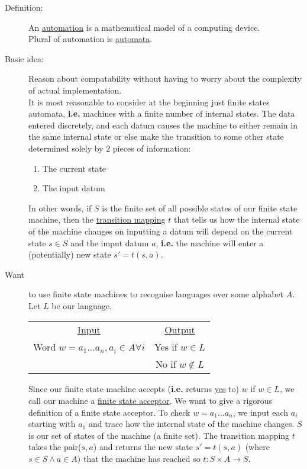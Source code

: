 \documentclass[10pt]{article}
\begin{document}
	\begin{description}
		\item[Definition:] An \underline{automation} is a mathematical model of a computing device. \\
		Plural of automation is \underline{automata}.
		\item[Basic idea:] Reason about compatability without having to worry about the complexity of actual implementation. \\
		It is most reasonable to consider at the beginning just finite states automata, \textbf{i.e.} machines with a finite number of internal states. The data entered discretely, and each datum causes the machine to either remain in the same internal state or else make the transition to some other state determined solely by 2 pieces of information:
		\begin{enumerate}
			\item The current state
			\item The input datum
		\end{enumerate}
		In other words, if $S$ is the finite set of all possible states of our finite state machine, then the \underline{transition mapping} $t$ that tells us how the internal state of the machine changes on inputting a datum will depend on the current state $s \in S$ and the imput datum $a$, \textbf{i.e.} the machine will enter a (potentially) new state $s' = t(s, a)$.
		\item[Want] to use finite state machines to recognise languages over some alphabet $A$. Let $L$ be our language.\\
		\begin{table}[h!]
			\centering
			\begin{tabular}{cc}
				\underline{Input} & \underline{Output} \\
				Word $w=a_1...a_n, a_i \in A \forall i$ & Yes if $w \in L$ \\
				& No if $w \notin L$
			\end{tabular}
		\end{table}
		Since our finite state machine accepts (\textbf{i.e.} returns \underline{yes} to) $w$ if $w \in L$, we call our machine a \underline{finite state acceptor}. We want to give a rigorous definition of a finite state acceptor. To check $w=a_1...a_n$, we input each $a_i$ starting with $a_1$ and trace how the internal state of the machine changes. $S$ is our set of states of the machine (a finite set). The transition mapping $t$ takes the pair($s, a$) and returns the new state $s'=t(s, a)$ (where $s \in S \land a \in A$) that the machine has reached so $t: S \times A \rightarrow S$. \\

\end{description}
\end{document}
